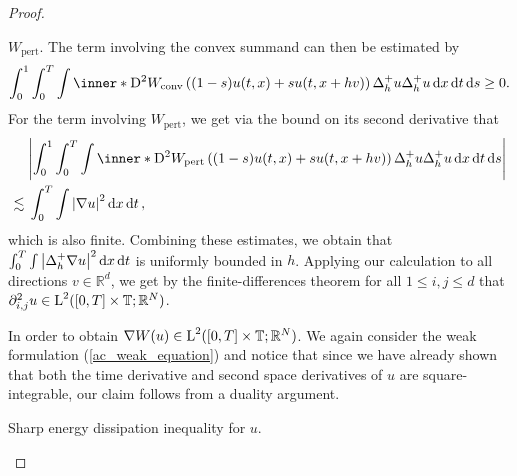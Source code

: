 \begin{proof}
\begin{description}[wide=0pt]
		$ W_{ \mathrm{pert} } $. The term involving the convex summand can then 
		be estimated by
		\begin{equation*}
			\int_{ 0 }^{ 1 }
			\int_{ 0 }^{ T }
			\int
			\inner*{ 
				\diff^{ 2 } W_{ \mathrm{conv} } \left( ( 1- s ) u ( t, x  ) + s u( t,  x + h v ) \right) 
				\Delta_{ h }^{ + } u
			}{
				\Delta_{ h }^{ + } u 
			}
			\dd{ x }
			\dd{ t }
			\dd{ s }
			\geq 0. 
		\end{equation*}
		For the term involving $ W_{ \mathrm{pert} } $, we get via the bound on 
		its second derivative that
		\begin{align*}
			& \abs{
				\int_{ 0 }^{ 1 }
				\int_{ 0 }^{ T }
				\int
				\inner*{ 
					\diff^{ 2 } W_{ \mathrm{pert} } \left( (1 - s ) u ( t, x  ) + s  u( t,  x + h v )  \right) 
					\Delta_{ h }^{ + } u
				}{
					\Delta_{ h }^{ + } u 
				}
				\dd{ x }
				\dd{ t }
				\dd{ s }
			}
			\\
			\lesssim {} &
			\int_{ 0 }^{ T }
			\int
			\abs{ \nabla u }^{ 2 }
			\dd{ x }
			\dd{ t },
		\end{align*}
		which is also finite. 
		Combining these estimates, we obtain that $ \int_{ 0 }^{ T } \int \abs{ \Delta_{ h }^{ + } \nabla u }^{ 2 } \dd{ x } \dd{ t } $ is uniformly bounded in $ h $. Applying our calculation to all directions $ v \in \mathbb{ R }^{ d } $, we get by the finite-differences theorem for all $ 1 \leq i, j \leq d $ that $ \partial_{ i , j }^{ 2 } u \in \operatorname{L}^{ 2 } ( [ 0 , T ] \times \operatorname{\mathbb{T}} ; \mathbb{ R }^{ N } ) $.
		
		In order to obtain $ \nabla W ( u ) \in \operatorname{L}^{ 2 } ( [ 0 , T ] \times 
		\operatorname{\mathbb{T}} ; \mathbb{ R }^{ N } ) $. We again consider the weak 
		formulation (\ref{ac_weak_equation}) and notice that since we have 
		already shown that both the time derivative and second space 
		derivatives of $ u $ are square-integrable, our claim follows from a 
		duality argument.
		
		\item[Step 9:] Sharp energy dissipation inequality for $ u $.
		

\end{description}
\end{proof}
